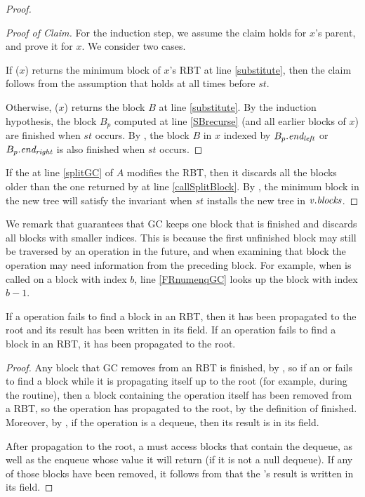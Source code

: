 \begin{proof}
\begin{proof}[Proof of Claim]
For the induction step, we assume the claim holds for $x$'s parent, and prove it for $x$.
We consider two cases.

If ($x$) returns the minimum block of $x$'s RBT at line \ref{substitute},
then the claim follows from the assumption that  holds at all times before $st$.

Otherwise, ($x$) returns the block $B$ at line \ref{substitute}.
By the induction hypothesis, the block $B_p$ computed at line \ref{SBrecurse}
(and all earlier blocks of $x$) are finished when $st$ occurs.
By , the block $B$ in $x$ indexed by $B_p.\mbox{\textit{end\textsubscript{left}}}$ or $B_p.\mbox{\textit{end\textsubscript{right}}}$
is also finished when $st$ occurs.
\renewcommand{\qedsymbol}{$\diamondsuit$}
\end{proof}

If the  at line \ref{splitGC} of $A$ modifies the RBT, then it discards
all the blocks older than the one returned by  at line \ref{callSplitBlock}.
By , the minimum block in the new tree will satisfy the invariant when $st$
installs the new tree in $\mbox{\textnormal{\textit{v}}}.\mbox{\textit{blocks}}$.
\end{proof}

We remark that  guarantees that GC keeps one block that is finished and discards all blocks with smaller indices.
This is because the first unfinished block may still be traversed by an operation in the future,
and when examining that block the operation may need information from the preceding block.  For example,
when  is called on a block with index $b$, line \ref{FRnumenqGC} looks up the block with
index $b-1$.

\begin{lemma}\label{blocknotfound}
If a  operation fails to find a block in an RBT,
then it has been propagated to the root and its result has been written in its  field.
If an  operation fails to find a block in an RBT, it has been propagated to the root.
\end{lemma}
\begin{proof}
Any block that GC removes from an RBT is finished, by , so if an 
 or  fails to find a block while it is propagating itself up to
the root (for example, during the  routine), then a block containing
the operation itself has been removed from a RBT, so the operation has propagated to the root,
by the definition of finished.
Moreover, by , if the operation is a dequeue, then its result is in its  field.

After propagation to the root, a  must access blocks that contain the dequeue,
as well as the enqueue whose value it will return (if it is not a null dequeue).
If any of those blocks have been removed, it follows from  that the
's result is written in its  field.
\end{proof}


